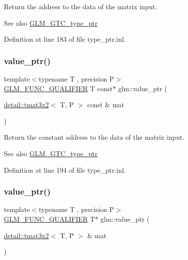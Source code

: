 Return the address to the data of the matrix input. \begin{DoxySeeAlso}{See also}
\hyperlink{group__gtc__type__ptr}{G\+L\+M\+\_\+\+G\+T\+C\+\_\+type\+\_\+ptr} 
\end{DoxySeeAlso}


Definition at line 183 of file type\+\_\+ptr.\+inl.

\mbox{\label{group__gtc__type__ptr_gaf8edbe29063a5b8221fc8afcb6af224d}} 
\subsubsection{\texorpdfstring{value\+\_\+ptr()}{value\_ptr()}\hspace{0.1cm}{\footnotesize\ttfamily [16/27]}}
{\footnotesize\ttfamily template$<$typename T , precision P$>$ \\
\hyperlink{setup_8hpp_a33fdea6f91c5f834105f7415e2a64407}{G\+L\+M\+\_\+\+F\+U\+N\+C\+\_\+\+Q\+U\+A\+L\+I\+F\+I\+ER} T const$\ast$ glm\+::value\+\_\+ptr (\begin{DoxyParamCaption}\item[{\hyperlink{structglm_1_1detail_1_1tmat3x2}{detail\+::tmat3x2}$<$ T, P $>$ const \&}]{mat }\end{DoxyParamCaption})}

Return the constant address to the data of the matrix input. \begin{DoxySeeAlso}{See also}
\hyperlink{group__gtc__type__ptr}{G\+L\+M\+\_\+\+G\+T\+C\+\_\+type\+\_\+ptr} 
\end{DoxySeeAlso}


Definition at line 194 of file type\+\_\+ptr.\+inl.

\mbox{\label{group__gtc__type__ptr_gae2e604002202417c7156db3deeb1301d}} 
\subsubsection{\texorpdfstring{value\+\_\+ptr()}{value\_ptr()}\hspace{0.1cm}{\footnotesize\ttfamily [17/27]}}
{\footnotesize\ttfamily template$<$typename T , precision P$>$ \\
\hyperlink{setup_8hpp_a33fdea6f91c5f834105f7415e2a64407}{G\+L\+M\+\_\+\+F\+U\+N\+C\+\_\+\+Q\+U\+A\+L\+I\+F\+I\+ER} T$\ast$ glm\+::value\+\_\+ptr (\begin{DoxyParamCaption}\item[{\hyperlink{structglm_1_1detail_1_1tmat3x2}{detail\+::tmat3x2}$<$ T, P $>$ \&}]{mat }\end{DoxyParamCaption})}

